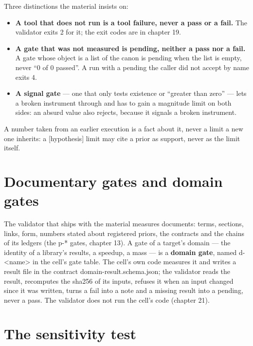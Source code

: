 \documentclass[
  american,
  10pt,
]{report}
\providecommand{\tightlist}{%
  \setlength{\itemsep}{0pt}\setlength{\parskip}{0pt}}
\renewcommand{\texttt}[1]{{\ttfamily\hyphenchar\font=-1 #1}}
\begin{document}
Three distinctions the material insists on:

\begin{itemize}
\tightlist
\item
  \textbf{A tool that does not run is a tool failure, never a pass or a
  fail.} The validator exits 2 for it; the exit codes are in chapter 19.
\item
  \textbf{A gate that was not measured is pending, neither a pass nor a
  fail.} A gate whose object is a list of the canon is pending when the
  list is empty, never ``0 of 0 passed''. A run with a pending the
  caller did not accept by name exits 4.
\item
  \textbf{A signal gate} --- one that only tests existence or ``greater
  than zero'' --- lets a broken instrument through and has to gain a
  magnitude limit on both sides: an absurd value also rejects, because
  it signals a broken instrument.
\end{itemize}

A number taken from an earlier execution is a fact about it, never a
limit a new one inherits: a \texttt{[hypothesis]} limit may cite a prior
as support, never as the limit itself.

\section{Documentary gates and domain
gates}\label{documentary-gates-and-domain-gates}

The validator that ships with the material measures documents: terms,
sections, links, form, numbers stated about registered priors, the
contracts and the chains of its ledgers (the \texttt{p-\allowbreak{}*}
gates, chapter 13). A gate of a target's domain --- the identity of a
library's results, a speedup, a mass --- is a \textbf{domain gate},
named \texttt{d-\allowbreak{}<name>} in the cell's gate table. The
cell's own code measures it and writes a result file in the contract
\texttt{domain-\allowbreak{}result.\allowbreak{}schema.\allowbreak{}json};
the validator reads the result, recomputes the sha256 of its inputs,
refuses it when an input changed since it was written, turns a
\texttt{fail} into a note and a missing result into a pending, never a
pass. The validator does not run the cell's code (chapter 21).

\section{The sensitivity test}\label{the-sensitivity-test}
\end{document}
